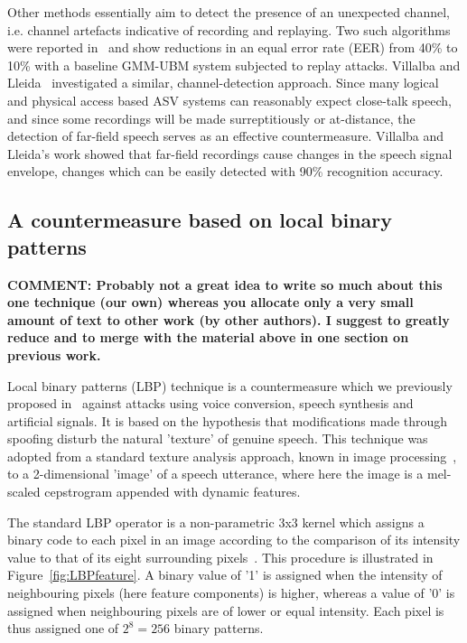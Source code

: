Other methods 
essentially aim to detect the presence of an unexpected channel, i.e. channel artefacts indicative of recording and replaying.
Two such algorithms were reported in~\cite{Wang2011} and show reductions in 
an equal error rate (EER) from 40\% to 10\% with a baseline GMM-UBM system subjected to replay attacks.
Villalba and Lleida~\cite{Villalba2011} investigated a similar, channel-detection approach.  
Since many logical and physical access based ASV systems can reasonably expect close-talk speech, and since some recordings will be made surreptitiously or at-distance, the detection of far-field speech serves as an effective countermeasure.  
Villalba and Lleida's work showed that far-field recordings cause changes in the speech signal envelope, changes which can be easily detected with 90\% recognition accuracy.


\subsection{A countermeasure based on local binary patterns}

{\bfseries COMMENT: Probably not a great idea to write so much about this one technique (our own) whereas you allocate only a very small amount of text to other work (by other authors).  I suggest to greatly reduce and to merge with the material above in one section on previous work.}

Local binary patterns (LBP) technique is a countermeasure which we previously proposed in~\cite{Alegre2013a} against attacks using voice conversion, speech synthesis and artificial signals. It is based on the hypothesis that modifications made through spoofing disturb the natural 'texture' of genuine speech. This technique was adopted from a standard texture analysis approach, known in image processing~\cite{Ojala2002}, to a 2-dimensional 'image' of a speech utterance, where here the image is a mel-scaled cepstrogram appended with dynamic features.

The standard LBP operator is a non-parametric 3x3 kernel which assigns a binary code to each pixel in an image according to the comparison of its intensity value to that of its eight surrounding pixels~\cite{Ojala2002}. This procedure is illustrated in Figure~\ref{fig:LBPfeature}.  A binary value of '1' is assigned when the intensity of neighbouring pixels (here feature components) is higher, whereas a value of '0' is assigned when neighbouring pixels are of lower or equal intensity. Each pixel is thus assigned one of $2^8=256$ binary patterns.

